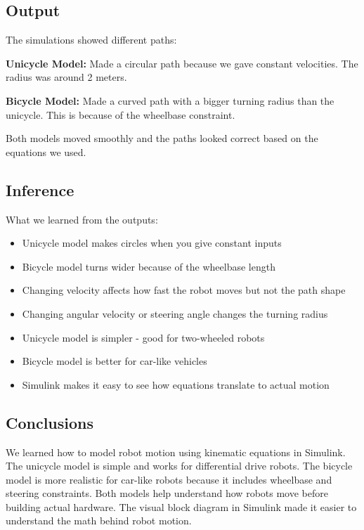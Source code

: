 \subsection{Output}

The simulations showed different paths:

\textbf{Unicycle Model:} Made a circular path because we gave constant velocities. The radius was around 2 meters.

\textbf{Bicycle Model:} Made a curved path with a bigger turning radius than the unicycle. This is because of the wheelbase constraint.

Both models moved smoothly and the paths looked correct based on the equations we used.

\subsection{Inference}

What we learned from the outputs:
\begin{itemize}
	\item Unicycle model makes circles when you give constant inputs
	\item Bicycle model turns wider because of the wheelbase length
	\item Changing velocity affects how fast the robot moves but not the path shape
	\item Changing angular velocity or steering angle changes the turning radius
	\item Unicycle model is simpler - good for two-wheeled robots
	\item Bicycle model is better for car-like vehicles
	\item Simulink makes it easy to see how equations translate to actual motion
\end{itemize}

\subsection{Conclusions}

We learned how to model robot motion using kinematic equations in Simulink. The unicycle model is simple and works for differential drive robots. The bicycle model is more realistic for car-like robots because it includes wheelbase and steering constraints. Both models help understand how robots move before building actual hardware. The visual block diagram in Simulink made it easier to understand the math behind robot motion.

\clearpage